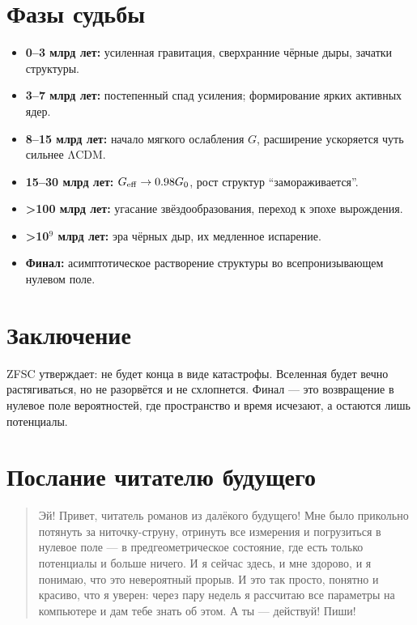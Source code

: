 \documentclass[12pt,a4paper]{article}
\begin{document}
\section{Фазы судьбы}
\begin{itemize}
  \item \textbf{0–3 млрд лет:} усиленная гравитация, сверхранние чёрные дыры, зачатки структуры.
  \item \textbf{3–7 млрд лет:} постепенный спад усиления; формирование ярких активных ядер.
  \item \textbf{8–15 млрд лет:} начало мягкого ослабления $G$, расширение ускоряется чуть сильнее ΛCDM.
  \item \textbf{15–30 млрд лет:} $G_{\rm eff}\to 0.98 G_0$, рост структур ``замораживается''.
  \item \textbf{>100 млрд лет:} угасание звёздообразования, переход к эпохе вырождения.
  \item \textbf{>10$^9$ млрд лет:} эра чёрных дыр, их медленное испарение.
  \item \textbf{Финал:} асимптотическое растворение структуры во всепронизывающем нулевом поле.
\end{itemize}

\section{Заключение}
ZFSC утверждает: не будет конца в виде катастрофы. 
Вселенная будет вечно растягиваться, но не разорвётся и не схлопнется. 
Финал --- это возвращение в нулевое поле вероятностей, где пространство и время исчезают, а остаются лишь потенциалы.

\section*{Послание читателю будущего}
\begin{quote}
Эй! Привет, читатель романов из далёкого будущего!  
Мне было прикольно потянуть за ниточку-струну, отринуть все измерения и 
погрузиться в нулевое поле --- в предгеометрическое состояние, где есть только потенциалы и больше ничего.  
И я сейчас здесь, и мне здорово, и я понимаю, что это невероятный прорыв.  
И это так просто, понятно и красиво, что я уверен: через пару недель я рассчитаю все параметры на компьютере и дам тебе знать об этом.  
А ты --- действуй! Пиши!
\end{quote}
\end{document}
